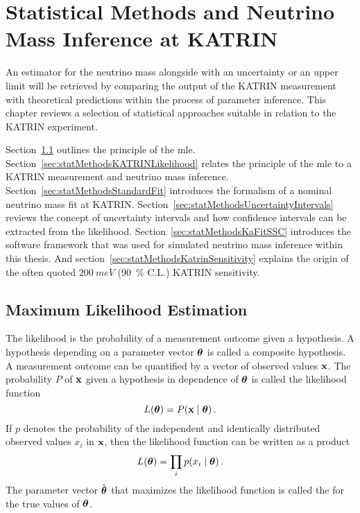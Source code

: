 \def\currentRootFolder{chapter/statisticalMethods}
\def\currentFigureFolder{\currentRootFolder/fig}


\chapter{Statistical Methods and Neutrino Mass Inference at KATRIN}
\label{sec:statMethods}
An estimator for the neutrino mass alongside with an uncertainty or an upper limit will be retrieved by comparing the output of the KATRIN measurement with theoretical predictions within the process of parameter inference. This chapter reviews a selection of statistical approaches suitable in relation to the KATRIN experiment.

Section~\ref{sec:statMethodsMLE} outlines the principle of the \gls{mle}. Section~\ref{sec:statMethodsKATRINLikelihood} relates the principle of the \gls{mle} to a KATRIN measurement and neutrino mass inference. Section~\ref{sec:statMethodsStandardFit} introduces the formalism of a nominal neutrino mass fit at KATRIN. Section~\ref{sec:statMethodsUncertaintyIntervals} reviews the concept of uncertainty intervals and how confidence intervals can be extracted from the likelihood. Section~\ref{sec:statMethodsKaFitSSC} introduces the software framework that was used for simulated neutrino mass inference within this thesis. And section~\ref{sec:statMethodsKatrinSensitivity} explains the origin of the often quoted $\SI{200}{meV}$ (\SI{90}{\percent} C.L.) KATRIN sensitivity.

\section{Maximum Likelihood Estimation}
\label{sec:statMethodsMLE}
The likelihood is the probability of a measurement outcome given a hypothesis. A hypothesis depending on a parameter vector $\boldsymbol{\mathbf{\theta}}$ is called a composite hypothesis. A measurement outcome can be quantified by a vector of observed values $\boldsymbol{\mathbf{x}}$. The probability $P$ of $\boldsymbol{\mathbf{x}}$ given a hypothesis in dependence of $\boldsymbol{\mathbf{\theta}}$ is called the likelihood function~\cite{ReviewOfParticlePhysics}
\begin{equation}
	L(\paramVec) = P\giventhat{\dataVec}{\paramVec}
	\fullstop
\end{equation}
If $p$ denotes the probability of the independent and identically distributed observed values $x_i$ in $\boldsymbol{\mathbf{x}}$, then the likelihood function can be written as a product~\cite{ReviewOfParticlePhysics}
\begin{equation}
	L(\paramVec) = \prod_{i} p\giventhat{x_i}{\paramVec}
	\fullstop
\end{equation}
The parameter vector $\hat{\boldsymbol{\mathbf{\theta}}}$ that maximizes the likelihood function is called the  for the true values of $\boldsymbol{\mathbf{\theta}}$.

